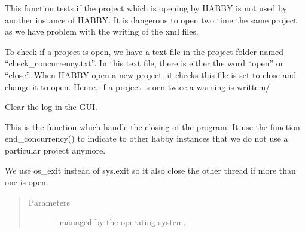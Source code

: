 \documentclass[letterpaper,10pt,english]{sphinxmanual}
\begin{document}
\begin{fulllineitems}
\begin{fulllineitems}
\end{fulllineitems}


\begin{fulllineitems}
\label{\detokenize{index:src_GUI.Main_windows_1.MainWindows.check_concurrency}}
This function tests if the project which is opening by HABBY is not used by another instance of HABBY. It is
dangerous  to open two time the same project as we have problem with the writing of the xml files.

To check if a project is open, we have a text file in the project folder named ``check\_concurrency.txt''.
In this text file, there is either the word ``open'' or ``close''. When HABBY open a new project, it checks
this file is set to close and change it to open. Hence, if a project is oen twice a warning is writtem/

\end{fulllineitems}


\begin{fulllineitems}
\label{\detokenize{index:src_GUI.Main_windows_1.MainWindows.clear_log}}
Clear the log in the GUI.

\end{fulllineitems}


\begin{fulllineitems}
\label{\detokenize{index:src_GUI.Main_windows_1.MainWindows.closeEvent}}
This is the function which handle the closing of the program. It use the function end\_concurrency() to indicate
to other habby instances that we do not use a particular project anymore.

We use os\_exit instead of sys.exit so it also close the other thread if more than one is open.
\begin{quote}\begin{description}
\item[{Parameters}] \leavevmode
{} -- managed by the operating system.

\end{description}\end{quote}


\end{fulllineitems}
\end{fulllineitems}
\end{document}
